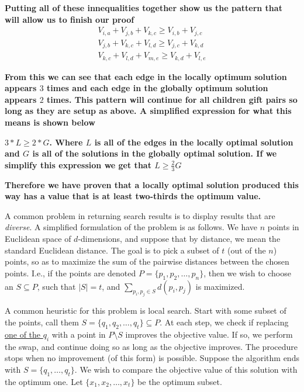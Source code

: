 \documentclass[addpoints]{exam}
\def\mysolution#1{}    %
\begin{document}
\begin{questions}
\textbf{Putting all of these innequalities together show us the pattern that will allow us to finish our proof}
\begin{align}
    V_{i,a} + V_{j,b} + V_{k,c} \ge V_{i,b} + V_{j,c} \\
    V_{j,b} + V_{k,c} + V_{l,d} \ge V_{j,c} + V_{k,d} \\ 
    V_{k,c} + V_{l,d} + V_{m,e} \ge V_{k,d} + V_{l,e}
\end{align}

\textbf{From this we can see that each edge in the locally optimum solution appears $3$ times and each edge in the globally optimum solution appears $2$ times. This pattern will continue for all children gift pairs so long as they are setup as above. A simplified expression for what this means is shown below}

\textbf{$3*L \ge 2*G$. Where $L$ is all of the edges in the locally optimal solution and $G$ is all of the solutions in the globally optimal solution. If we simplify this expression we get that $L \ge \frac{2}{3} G$}

\textbf{Therefore we have proven that a locally optimal solution produced this way has a value that is at least two-thirds the optimum value.}
\mysolution{
    
}



A common problem in returning search results is to display results that are {\em diverse}. A simplified formulation of the problem is as follows. We have $n$ points in Euclidean space of $d$-dimensions, and suppose that by distance, we mean the standard Euclidean distance. The goal is to pick a subset of $t$ (out of the $n$) points, so as to maximize the sum of the pairwise distances between the chosen points. 
I.e., if the points are denoted $P = \{p_1, p_2, \dots, p_n\}$, then we wish to choose an $S \subseteq P$, such that $|S| = t$, and $\sum_{p_i, p_j \in S} d(p_i, p_j)$ is maximized.

A common heuristic for this problem is local search. Start with some subset of the points, call them $S = \{q_1, q_2, \dots, q_t\} \subseteq P$. At each step, we check if replacing \underline{one of the $q_i$} with a point in $P \setminus S$ improves the objective value.  If so, we perform the swap, and continue doing so as long as the objective improves. The procedure stops when no improvement (of this form) is possible. Suppose the algorithm ends with $S = \{q_1, \dots, q_t\}$.  We wish to compare the objective value of this solution with the optimum one. Let $\{x_1, x_2, \dots, x_t\}$ be the optimum subset. 


\end{questions}
\end{document}
